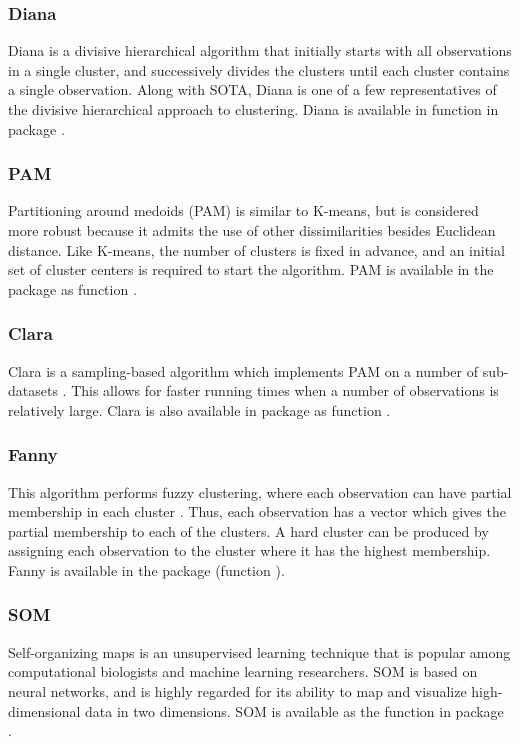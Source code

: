 \documentclass[11pt]{article}
\begin{document}
\subsubsection*{Diana}
Diana is a divisive hierarchical algorithm that initially starts with
all observations in a single cluster, and successively divides the
clusters until each cluster contains a single observation.  
Along with SOTA, Diana is one of a few representatives of the divisive hierarchical approach
to clustering.  Diana is available in function  in package .


\subsubsection*{PAM}
Partitioning around medoids (PAM) is similar to K-means, but is considered more
robust because it admits the use of other dissimilarities besides
Euclidean distance.  Like K-means, the number of clusters is fixed in
advance, and an initial set of cluster centers is required to start
the algorithm.  PAM is available in the  package as
function .

\subsubsection*{Clara}
Clara is a sampling-based algorithm which implements PAM
on a number of sub-datasets \citep{Kau1990}. This allows for faster
running times when a number of observations is relatively large.
Clara is also available in package  as function .


\subsubsection*{Fanny}
This algorithm performs fuzzy clustering, where each observation can
have partial membership in each cluster \citep{Kau1990}. Thus, each
observation has a vector which gives the partial membership to each of
the clusters.  
A hard cluster can be produced by assigning each observation to the
cluster where it has the highest membership.  Fanny is available in
the  package (function ).


\subsubsection*{SOM}
Self-organizing maps \citep{Koh1997} is an unsupervised learning
technique that is popular among computational biologists and
machine learning researchers.  SOM is based on neural
networks,
and is highly regarded for its ability to
map and visualize high-dimensional data in two dimensions.
SOM is available as the  function in package .
\end{document}
